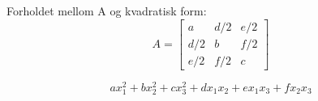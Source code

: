 Forholdet mellom A og kvadratisk form:
$$A = \begin{bmatrix}
        a   & d/2  & e/2 \\
        d/2 & b    & f/2 \\
        e/2 & f/2  & c
      \end{bmatrix}$$

$$ax_1^2 + bx_2^2 + cx_3^2 + dx_1x_2 + ex_1x_3 + fx_2x_3$$
